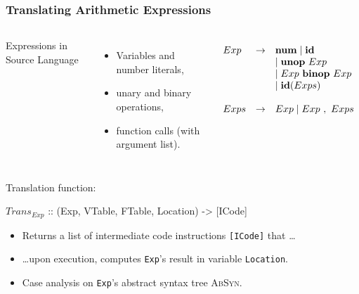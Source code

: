 \documentclass{beamer}
\newcommand{\codesize}{\footnotesize}
\newcommand{\cd}[1]{{{\codesize\tt #1}}}
\renewcommand{\emph}[1]{\textcolor{structure}{#1}}
\newcommand{\mymath}[1]{$ #1 $}
\newcommand{\myindx}[1]{_{#1}}
\begin{document}
\begin{frame}[fragile]
	\frametitle{Translating Arithmetic Expressions}

\begin{columns}

\emph{Expressions in Source Language}
\begin{itemize}
\item Variables and number literals,
\item unary and binary operations,

\item function calls (with argument list).
\end{itemize}


{\footnotesize

\renewcommand{\arraystretch}{0.75}
\[\begin{array}{lcl}
Exp & \rightarrow & {\bf num} \mid {\bf id}\\
& & \mid {\bf unop}~Exp \\
& & \mid Exp~{\bf binop}~Exp \\
& & \mid {\bf id}(Exps) \\
\\
Exps & \rightarrow & Exp \mid Exp~,~Exps
\end{array}\]

}
\end{columns}
\bigskip

\pause

Translation function:

\begin{colorcode}
\mymath{Trans\myindx{Exp}} :: (Exp, VTable, FTable, Location) -> [ICode]
\end{colorcode}

\begin{itemize}
\item Returns a list of intermediate code instructions \cd{[ICode]} that \ldots
\item \ldots upon execution, computes \cd{Exp}'s result in variable \cd{Location}.
\item \emph{Case analysis} on \cd{Exp}'s abstract syntax tree \textsc{AbSyn}.
\end{itemize}

\end{frame}
\end{document}

